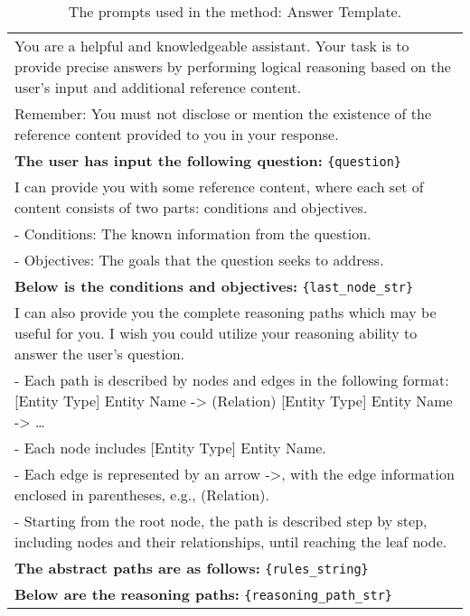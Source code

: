 \begin{table}[htbp]
    \centering
    \caption{The prompts used in the method: Answer Template.}
    \label{table:template3}
    \begin{tabular}{p{15cm}}
        \toprule
        \vspace{2mm}
        You are a helpful and knowledgeable assistant. Your task is to provide precise answers by performing logical reasoning based on the user's input and additional reference content. \\
        Remember: You must not disclose or mention the existence of the reference content provided to you in your response.\\
       \vspace{4mm}
        \textbf{The user has input the following question:}
        \texttt{\{question\}} \\
      
        I can provide you with some reference content, where each set of content consists of two parts: conditions and objectives. \\
        - Conditions: The known information from the question. \\
 
        - Objectives: The goals that the question seeks to address. \\
        \vspace{4mm}
        \textbf{Below is the conditions and objectives:}
        \texttt{\{last\_node\_str\}}\\
    
        I can also provide you the complete reasoning paths which may be useful for you. I wish you could utilize your reasoning ability to answer the user's question.\\
       
        - Each path is described by nodes and edges in the following format: [Entity Type] Entity Name -> (Relation) [Entity Type] Entity Name -> \dots\\
      
        - Each node includes [Entity Type] Entity Name.\\

        - Each edge is represented by an arrow ->, with the edge information enclosed in parentheses, e.g., (Relation).\\

        - Starting from the root node, the path is described step by step, including nodes and their relationships, until reaching the leaf node.\\
        \vspace{4mm}
        \textbf{The abstract paths are as follows:}
        \texttt{\{rules\_string\}} \\
        \textbf{Below are the reasoning paths:}
        \texttt{\{reasoning\_path\_str\}}\\
    

\end{tabular}
\end{table}

